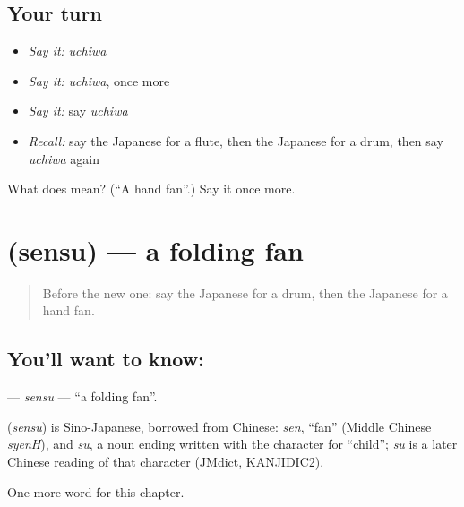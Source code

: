 \subsection*{Your turn}
\begin{itemize}
\raggedright
  \item \emph{Say it:} \emph{uchiwa}
  \item \emph{Say it:} \emph{uchiwa}, once more
  \item \emph{Say it:} say \emph{uchiwa}
  \item \emph{Recall:} say the Japanese for a flute, then the Japanese for a drum, then say \emph{uchiwa} again
\end{itemize}

\begin{tcolorbox}[breakable,colback=teal!4,colframe=teal!35!black,title={Before you move on}]
What does  mean? (\textquotedblleft{}A hand fan\textquotedblright{}.) Say it once more.
\end{tcolorbox}
\section[\texorpdfstring{\ja{せんす} (sensu)}{せんす (sensu)}]{ (sensu) — a folding fan}

\label{lesson:JA-C67-sensu}



\begin{quote}
Before the new one: say the Japanese for a drum, then the Japanese for a hand fan.
\end{quote}

\subsection*{You'll want to know: }
\textbf{} — \emph{sensu} — \textquotedblleft{}a folding fan\textquotedblright{}.

\begin{cousinweb}
\textbf{} (\emph{sensu}) is Sino-Japanese, borrowed from Chinese: \emph{sen}, \textquotedblleft{}fan\textquotedblright{} (Middle Chinese \emph{syenH}), and \emph{su}, a noun ending written with the character for \textquotedblleft{}child\textquotedblright{}; \emph{su} is a later Chinese reading of that character (JMdict, KANJIDIC2).
\end{cousinweb}

\begin{grammarlens}[title={What you've built}]
One more word for this chapter.
\end{grammarlens}

